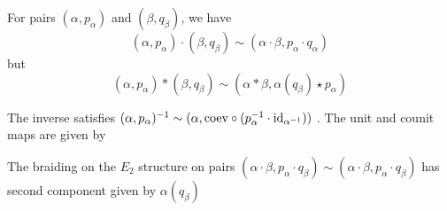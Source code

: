 \documentclass{amsart}
\begin{document}
\begin{lemma}
For pairs $(\alpha,p_\alpha)$ and $(\beta,q_\beta)$, we have
\[(\alpha,p_\alpha) \cdot (\beta,q_\beta) \sim (\alpha \cdot \beta, p_\alpha \cdot q_\alpha)\] but
\[(\alpha,p_\alpha) \ast (\beta,q_\beta) \sim (\alpha \ast \beta, \alpha(q_\beta) \star p_\alpha)\] 

The inverse satisfies $(\alpha, p_\alpha)^{-1} \sim (\alpha, \mathrm{coev} \circ (p_\alpha^{-1} \cdot \mathrm{id}_{\alpha^{-1}}))$ . The unit and counit maps are given by 

The braiding on the $E_2$ structure on pairs  $(\alpha \cdot \beta, p_\alpha \cdot q_\beta) \sim (\alpha \cdot \beta, p_\alpha \cdot q_\beta)$ has second component given by $\alpha(q_\beta)$ 
\end{lemma}


%
%
%
%
\end{document}
